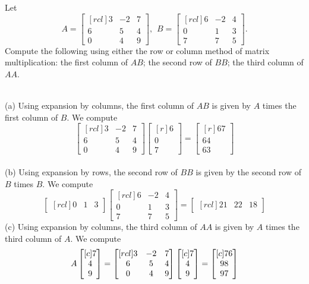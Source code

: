 \ii Let 
\[A = 
\begin{bmatrix}[rcl]
3&-2&7\\
6&5&4\\
0&4&9
\end{bmatrix}
, \hspace{5pt} B = 
\begin{bmatrix}[rcl]
6&-2&4\\
0&1&3\\
7&7&5
\end{bmatrix}.
\]
Compute the following using either the row or column method of matrix multiplication:
\bb
\ii the first column of $AB$;
\ii the second row of $BB$;
\ii the third column of $AA$. 
\ee
\begin{solution} 
\ \\
(a) 
Using expansion by columns, the first column of $AB$ is given by $A$ times the first column of $B$. We compute
\[
\begin{bmatrix}[rcl]
3&-2&7\\
6&5&4\\
0&4&9
\end{bmatrix}
\begin{bmatrix}[r]
6\\
0\\
7
\end{bmatrix}
=
\begin{bmatrix}[r]
67\\
64\\
63
\end{bmatrix}
\]
\ \\
(b) Using expansion by rows, the second row of $BB$ is given by the second row of $B$ times $B$. We compute
\[
\begin{bmatrix}[rcl]
0&1&3
\end{bmatrix}
\begin{bmatrix}[rcl]
6&-2&4\\
0&1&3\\
7&7&5
\end{bmatrix}
=
\begin{bmatrix}[rcl]
21&22&18
\end{bmatrix}
\]
\noindent
(c) 
Using expansion by columns, the third column of $AA$ is given by $A$ times the third column of $A$. We compute
\[
A\begin{bmatrix}[c] 7 \\ 4 \\ 9 \end{bmatrix}=\begin{bmatrix}[rcl]
3&-2&7\\
6&5&4\\
0&4&9
\end{bmatrix}
\begin{bmatrix}[c] 7 \\ 4 \\ 9 \end{bmatrix}=\begin{bmatrix}[c] 76\\98\\97 \end{bmatrix}
\]

\end{solution}


